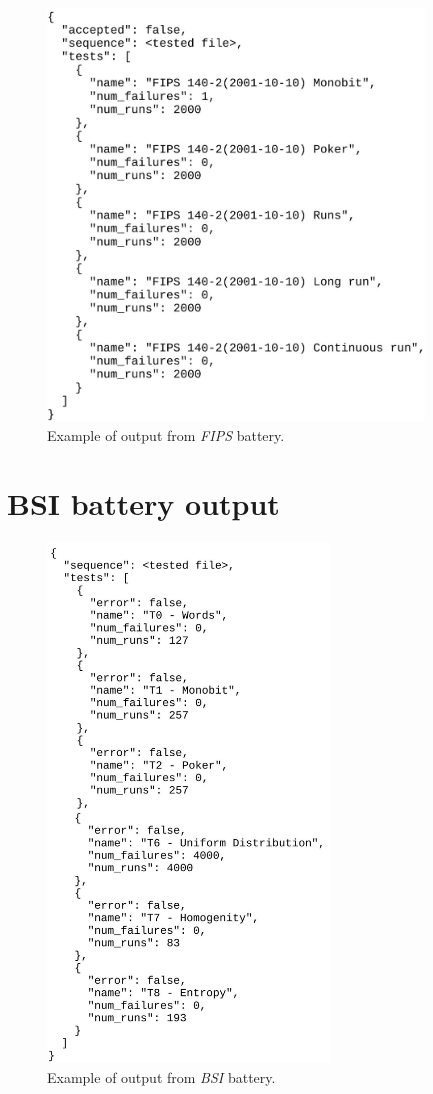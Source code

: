 \documentclass[
  digital,     %
  oneside,     %
  nosansbold,  %
  nocolorbold, %
  nolof,         %
  nolot,         %
]{fithesis4}
\begin{document}
\begin{figure}[h]
  \begin{center}
    \includegraphics[width=10cm]{figures/outputs-appendix/fips.jpg}
  \end{center}
  \caption{Example of output from \emph{FIPS} battery.}
  \label{fig:fips_example}
\end{figure}

\section{BSI battery output} \label{append:bsi-output}


\begin{figure}[H]
  \begin{center}
    \includegraphics[width=7.5cm]{figures/outputs-appendix/bsi.jpg}
  \end{center}
  \caption{Example of output from \emph{BSI} battery.}
  \label{fig:bsi_example}
\end{figure}
\end{document}
